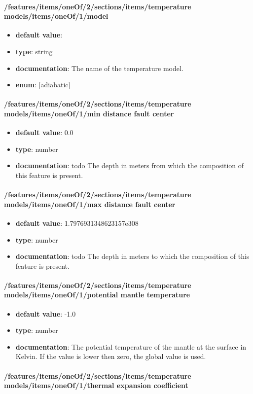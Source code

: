 \paragraph{/features/items/oneOf/2/sections/items/temperature models/items/oneOf/1/model}
\begin{itemize}\item {\bf default value}: 
\item {\bf type}: string
\item {\bf documentation}: The name of the temperature model.
\item {\bf enum}: [adiabatic]\end{itemize}\paragraph{/features/items/oneOf/2/sections/items/temperature models/items/oneOf/1/min distance fault center}
\begin{itemize}\item {\bf default value}: 0.0
\item {\bf type}: number
\item {\bf documentation}: todo The depth in meters from which the composition of this feature is present.
\end{itemize}\paragraph{/features/items/oneOf/2/sections/items/temperature models/items/oneOf/1/max distance fault center}
\begin{itemize}\item {\bf default value}: 1.7976931348623157e308
\item {\bf type}: number
\item {\bf documentation}: todo The depth in meters to which the composition of this feature is present.
\end{itemize}\paragraph{/features/items/oneOf/2/sections/items/temperature models/items/oneOf/1/potential mantle temperature}
\begin{itemize}\item {\bf default value}: -1.0
\item {\bf type}: number
\item {\bf documentation}: The potential temperature of the mantle at the surface in Kelvin. If the value is lower then zero, the global value is used.
\end{itemize}\paragraph{/features/items/oneOf/2/sections/items/temperature models/items/oneOf/1/thermal expansion coefficient}

